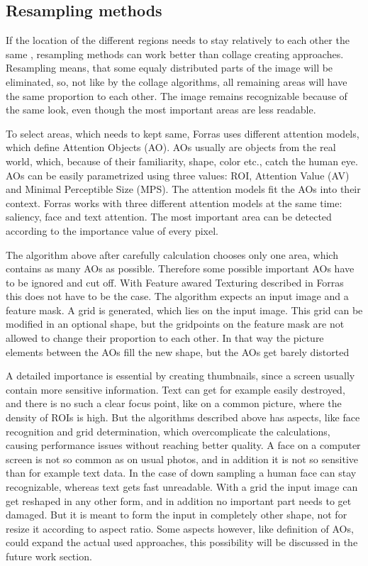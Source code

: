 \documentclass[draft,final]{vutinfth} %
\begin{document}
\subsection{Resampling methods}
If the location of the different regions needs to stay relatively to each other the same , resampling methods can work better than collage creating approaches.
Resampling means, that some equaly distributed parts of the image will be eliminated, so,  not like by the collage algorithms, all remaining areas will have the same proportion to each other.
The image remains recognizable because of the same look, even though the most important areas are less readable.\par 
To select areas, which needs to kept same, Forras uses different attention models, which define Attention Objects (AO).
AOs usually are objects from the real world, which,  because of their familiarity, shape, color etc., catch the human eye.
AOs can be easily parametrized using three values: ROI, Attention Value (AV) and Minimal Perceptible Size (MPS).
The attention models fit the AOs into their context.
Forras works with three different attention models at the same time: saliency, face and text attention.
The most important area can be detected according to the importance value of every pixel.\par 
The algorithm above after carefully calculation chooses only one area, which contains as many AOs as possible.
Therefore some possible important AOs have to be ignored and cut off.
With Feature awared Texturing described in Forras this does not have to be the case.
The algorithm expects an input image and a feature mask.
A grid is generated, which lies on the input image.
This grid can be modified in an optional shape, but the gridpoints on the feature mask are not allowed to change their proportion to each other.
In that way the picture elements between the AOs fill the new shape, but the AOs get barely distorted\par 
A detailed importance is essential by creating thumbnails, since a screen usually contain more sensitive information.
Text can get for example  easily destroyed, and there is no such a clear focus point, like on a common picture, where the density of ROIs is high. 
But the algorithms described above has aspects, like face recognition and grid determination, which overcomplicate the calculations, causing performance issues without reaching better quality.
A face on a computer screen is not so common as on usual photos, and in addition it is not so sensitive than for example text data.
In the case of down sampling a human face can stay recognizable, whereas text gets fast unreadable. 
With a grid the input image can get reshaped in any other form, and in addition no important part needs to get damaged.
But it is meant to form the input in completely other shape, not for resize it according to aspect ratio.
Some aspects however, like definition of AOs, could expand the actual used approaches, this possibility will be discussed in the future work section.
\end{document}
